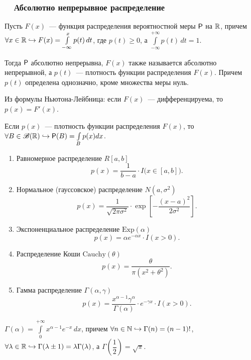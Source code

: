 \subsubsection*{~~Абсолютно непрерывное распределение}
\begin{definition}
	Пусть $F(x)$~--- функция распределения вероятностной меры $\P$ на $\R$, причем $\forall x \in \R \hookrightarrow F(x) = \int\limits_{-\infty}^{x} p(t) \, d t$, где  $p(t) \geqslant 0$, а $\int\limits_{-\infty}^{+\infty} p(t) \, d t = 1$. 
	
	Тогда $\P$ абсолютно непрерывна, $F(x)$ также называется абсолютно непрерывной, а $p(t)$~--- плотность функции распределения $F(x)$. Причем $p(t)$ определена однозначно, кроме множества меры нуль.
	
	Из формулы Ньютона-Лейбница: если $F(x)$~--- дифференцируема, то $p(x) = F'(x)$.
	
	Если $p(x)$~--- плотность функции распределения $F(x)$, то $\forall B \in \B(\R) \hookrightarrow \P(B) = \int\limits_{B} p(x)dx$.
\end{definition}

\begin{enumerate}
	\item{Равномерное распределение $R[a,b]$ 
		$$p(x) = \frac{1}{b -a } \cdot I \big( x \in [a,b] \big). $$
	}
		
	\item{Нормальное (гауссовское) распределение $N(a, \sigma^2)$
		$$p(x) = \frac{1}{\sqrt{2 \pi \sigma^2}} \cdot \exp \left[ -\frac{(x - a)^2}{2 \sigma^2} \right]. $$
	}
		
	\item{Экспоненциальное распределение $\text{Exp}(\alpha)$
	    $$p(x) = \alpha e^{-\alpha x} \cdot I(x > 0).$$
	}
	
	\item{Распределение Коши $\text{Cauchy}(\theta)$
		$$p(x) = \frac{\theta}{\pi \left(x^2 + \theta^2 \right)}.$$
	}
		
	\item{Гамма распределение $\Gamma(\alpha, \gamma)$
		$$p(x) = \frac{x^{\alpha - 1} \gamma^{\alpha}}{\Gamma(\alpha)} \cdot e^{-\gamma x} \cdot I(x > 0).$$
	}
\end{enumerate}

\begin{definition}
	$\Gamma(\alpha) = \int\limits_0^{+\infty} x^{\alpha - 1} e^{-x} \, d x$, причем $\forall n \in \N \hookrightarrow \Gamma(n) = (n - 1)!$, $\forall \lambda \in \R \hookrightarrow \Gamma(\lambda \pm 1) = \lambda \Gamma(\lambda)$, а $\Gamma\left(\dfrac{1}{2}\right) = \sqrt{\pi}$.
\end{definition}


